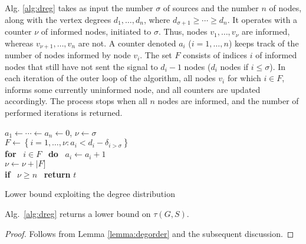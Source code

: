 Alg. \ref{alg:dreg} takes as input the number $\sigma$ of sources and the number $n$ of nodes, along with the vertex degrees $d_1,\ldots,d_n$,
where $d_{\sigma+1}\geq\cdots\geq d_n$.
It operates with a counter $\nu$ of informed nodes, initiated to $\sigma$.
Thus, nodes $v_1,\ldots,v_{\nu}$ are informed, whereas $v_{\nu+1},\ldots,v_n$ are not.
A counter denoted $a_i$ ($i=1,\ldots,n$) keeps track of the number of nodes informed by node $v_i$.
The set $F$ consists of indices $i$ of informed nodes that still have not sent the signal to $d_i-1$ nodes ($d_i$ nodes if $i\leq\sigma$). 
In each iteration of the outer loop of the algorithm, all nodes $v_i$ for which $i\in F$, informs some currently uninformed node,
and all counters are updated accordingly.
The process stops when all $n$ nodes are informed, and the number of performed iterations is returned.

\begin{algorithm}
$a_1\leftarrow\cdots\leftarrow a_n\leftarrow 0$, $\nu\leftarrow\sigma$ \\
 {
	$F\leftarrow\left\{i=1,\ldots,\nu: a_i<d_i-\delta_{i>\sigma}\right\}$\\
	\textbf{for} ~$i\in F$ ~\textbf{do} ~$a_i\leftarrow a_i+1$ \\
	$\nu\leftarrow\nu+|F]$ \\
	\textbf{if} ~$\nu\geq n$ ~\textbf{return} $t$ \\
}
\caption{Lower bound exploiting the degree distribution}
\label{alg:dreg}
\end{algorithm}


\begin{proposition}
Alg.~\ref{alg:dreg} returns a lower bound on $\tau(G,S)$.
\label{cor:deg}
\end{proposition}
\begin{proof}
		Follows from Lemma \ref{lemma:degorder} and the subsequent discussion. 
\end{proof}


